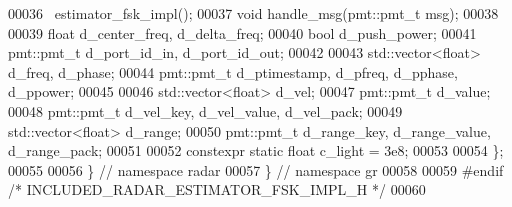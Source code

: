 \begin{DoxyCode}
00036       ~estimator_fsk_impl();
00037       \textcolor{keywordtype}{void} handle_msg(pmt::pmt\_t msg);
00038       
00039       \textcolor{keywordtype}{float} d_center_freq, d_delta_freq;
00040       \textcolor{keywordtype}{bool} d_push_power;
00041       pmt::pmt\_t d_port_id_in, d_port_id_out;
00042       
00043       std::vector<float> d_freq, d_phase;
00044       pmt::pmt\_t d_ptimestamp, d_pfreq, d_pphase, d_ppower;
00045       
00046       std::vector<float> d_vel;
00047       pmt::pmt\_t d_value;
00048       pmt::pmt\_t d_vel_key, d_vel_value, d_vel_pack;
00049       std::vector<float> d_range;
00050       pmt::pmt\_t d_range_key, d_range_value, d_range_pack;
00051       
00052       constexpr \textcolor{keyword}{static} \textcolor{keywordtype}{float} c_light = 3e8;
00053       
00054     \};
00055 
00056   \} \textcolor{comment}{// namespace radar}
00057 \} \textcolor{comment}{// namespace gr}
00058 
00059 \textcolor{preprocessor}{#endif }\textcolor{comment}{/* INCLUDED\_RADAR\_ESTIMATOR\_FSK\_IMPL\_H */}\textcolor{preprocessor}{}
00060 
\end{DoxyCode}

